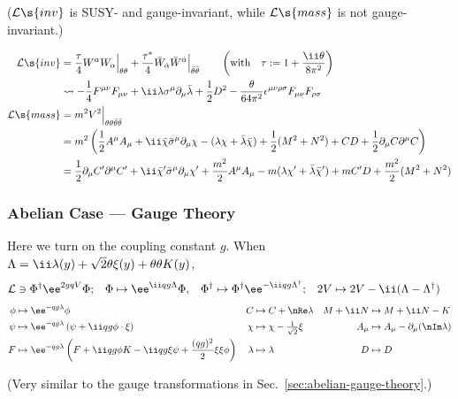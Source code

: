 \vspace{-1.1zw}
\begin{flushright}\footnotesize
 ($\Lag\s{inv}$ is SUSY- and gauge-invariant, while $\Lag\s{mass}$ is not gauge-invariant.)
\end{flushright}\vspace{-14pt}
\begin{align}
 \mathcal L\s{inv}
&= \frac\tau4 W^\alpha W_\alpha\Big|_\thth + \frac{\tau^*}4 \bar W_\dalpha\bar W^\dalpha\Big|_\bthth
 \qquad\left(\text{with}\quad \tau:=1+\frac{\ii\theta}{8\pi^2}\right)\notag\\
&\leadsto -\frac14F^{\mu\nu}F_{\mu\nu}+\ii\lambda\Sm\Pm\bar\lambda + \frac12 D^2
   -\frac{\theta}{64\pi^2}\epsilon^{\mu\nu\rho\sigma}F_{\mu\nu}F_{\rho\sigma}\\
 \mathcal L\s{mass}
&= m^2 V^2\Big|_{\thth\bthth}\notag\\
&= m^2\left(\frac12 A^\mu A_\mu + \ii\bar\chi\bSm\Pm\chi - (\lambda\chi+\bar\lambda\bar\chi) + \frac12(M^2+N^2) + CD + \frac12{\Pm C\Pmu C}\right)\notag\\
&= \frac12{\Pm C'\Pmu C'}+ \ii \bar\chi'\bSm\Pm\chi'
   + \frac{m^2}2 A^\mu A_\mu -  m(\lambda\chi'+\bar\lambda\bar\chi') + mC'D + \frac{m^2}{2}(M^2+N^2)
\end{align}

\subsubsection{Abelian Case --- Gauge Theory}\vspace{-6pt}
Here we turn on the coupling constant $g$. When $\Lambda=\ii\lambda(y)+\sqrt2\theta\xi(y)+\thth K(y)$,
\begin{align}
\Lag&\ni\Phi^\dagger\ee^{2gqV}\Phi;&
 \Phi\mapsto \ee^{\ii qg \Lambda}\Phi,\quad& \Phi^\dagger\mapsto \Phi^\dagger\ee^{-\ii qg \Lambda^\dagger};& 2V&\mapsto 2V-\ii(\Lambda-\Lambda^\dagger)
\end{align}
\begin{align*}
  \phi&\mapsto \ee^{- qg\lambda}\phi&
  C   &\mapsto C+\nRe \lambda&
M+\ii N&\mapsto M+\ii N-K
\\
  \psi&\mapsto \ee^{- qg\lambda}\left(\psi+\ii qg\phi\cdot \xi\right)&
  \chi&\mapsto \chi-\tfrac{1}{\sqrt2} \xi&
A_\mu &\mapsto A_\mu- \Pm(\nIm\lambda)
\\
  F   &\mapsto \ee^{- qg\lambda}\left(F+\ii qg\phi K-\ii qg \xi\psi +\frac{(qg)^2}{2}\xi\xi\phi\right)&
\lambda&\mapsto\lambda&
D&\mapsto D\\
\end{align*}\vspace{-45pt}
\begin{flushright}
\footnotesize
(Very similar to the gauge transformations in Sec.~\ref{sec:abelian-gauge-theory}.)
\end{flushright}\vspace{-10pt}

